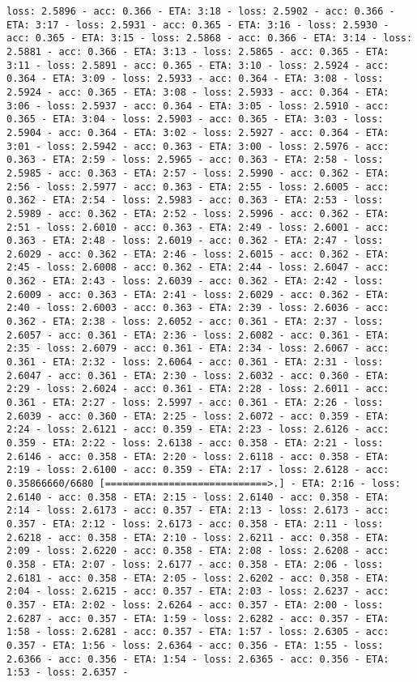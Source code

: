 \documentclass[11pt]{article}
\begin{document}
\begin{Verbatim}[commandchars=\\\{\}]
loss: 2.5896 - acc: 0.366 - ETA: 3:18 - loss: 2.5902 - acc: 0.366 - ETA: 3:17 - loss: 2.5931 - acc: 0.365 - ETA: 3:16 - loss: 2.5930 - acc: 0.365 - ETA: 3:15 - loss: 2.5868 - acc: 0.366 - ETA: 3:14 - loss: 2.5881 - acc: 0.366 - ETA: 3:13 - loss: 2.5865 - acc: 0.365 - ETA: 3:11 - loss: 2.5891 - acc: 0.365 - ETA: 3:10 - loss: 2.5924 - acc: 0.364 - ETA: 3:09 - loss: 2.5933 - acc: 0.364 - ETA: 3:08 - loss: 2.5924 - acc: 0.365 - ETA: 3:08 - loss: 2.5933 - acc: 0.364 - ETA: 3:06 - loss: 2.5937 - acc: 0.364 - ETA: 3:05 - loss: 2.5910 - acc: 0.365 - ETA: 3:04 - loss: 2.5903 - acc: 0.365 - ETA: 3:03 - loss: 2.5904 - acc: 0.364 - ETA: 3:02 - loss: 2.5927 - acc: 0.364 - ETA: 3:01 - loss: 2.5942 - acc: 0.363 - ETA: 3:00 - loss: 2.5976 - acc: 0.363 - ETA: 2:59 - loss: 2.5965 - acc: 0.363 - ETA: 2:58 - loss: 2.5985 - acc: 0.363 - ETA: 2:57 - loss: 2.5990 - acc: 0.362 - ETA: 2:56 - loss: 2.5977 - acc: 0.363 - ETA: 2:55 - loss: 2.6005 - acc: 0.362 - ETA: 2:54 - loss: 2.5983 - acc: 0.363 - ETA: 2:53 - loss: 2.5989 - acc: 0.362 - ETA: 2:52 - loss: 2.5996 - acc: 0.362 - ETA: 2:51 - loss: 2.6010 - acc: 0.363 - ETA: 2:49 - loss: 2.6001 - acc: 0.363 - ETA: 2:48 - loss: 2.6019 - acc: 0.362 - ETA: 2:47 - loss: 2.6029 - acc: 0.362 - ETA: 2:46 - loss: 2.6015 - acc: 0.362 - ETA: 2:45 - loss: 2.6008 - acc: 0.362 - ETA: 2:44 - loss: 2.6047 - acc: 0.362 - ETA: 2:43 - loss: 2.6039 - acc: 0.362 - ETA: 2:42 - loss: 2.6009 - acc: 0.363 - ETA: 2:41 - loss: 2.6029 - acc: 0.362 - ETA: 2:40 - loss: 2.6003 - acc: 0.363 - ETA: 2:39 - loss: 2.6036 - acc: 0.362 - ETA: 2:38 - loss: 2.6052 - acc: 0.361 - ETA: 2:37 - loss: 2.6057 - acc: 0.361 - ETA: 2:36 - loss: 2.6082 - acc: 0.361 - ETA: 2:35 - loss: 2.6079 - acc: 0.361 - ETA: 2:34 - loss: 2.6067 - acc: 0.361 - ETA: 2:32 - loss: 2.6064 - acc: 0.361 - ETA: 2:31 - loss: 2.6047 - acc: 0.361 - ETA: 2:30 - loss: 2.6032 - acc: 0.360 - ETA: 2:29 - loss: 2.6024 - acc: 0.361 - ETA: 2:28 - loss: 2.6011 - acc: 0.361 - ETA: 2:27 - loss: 2.5997 - acc: 0.361 - ETA: 2:26 - loss: 2.6039 - acc: 0.360 - ETA: 2:25 - loss: 2.6072 - acc: 0.359 - ETA: 2:24 - loss: 2.6121 - acc: 0.359 - ETA: 2:23 - loss: 2.6126 - acc: 0.359 - ETA: 2:22 - loss: 2.6138 - acc: 0.358 - ETA: 2:21 - loss: 2.6146 - acc: 0.358 - ETA: 2:20 - loss: 2.6118 - acc: 0.358 - ETA: 2:19 - loss: 2.6100 - acc: 0.359 - ETA: 2:17 - loss: 2.6128 - acc: 0.35866660/6680 [============================>.] - ETA: 2:16 - loss: 2.6140 - acc: 0.358 - ETA: 2:15 - loss: 2.6140 - acc: 0.358 - ETA: 2:14 - loss: 2.6173 - acc: 0.357 - ETA: 2:13 - loss: 2.6173 - acc: 0.357 - ETA: 2:12 - loss: 2.6173 - acc: 0.358 - ETA: 2:11 - loss: 2.6218 - acc: 0.358 - ETA: 2:10 - loss: 2.6211 - acc: 0.358 - ETA: 2:09 - loss: 2.6220 - acc: 0.358 - ETA: 2:08 - loss: 2.6208 - acc: 0.358 - ETA: 2:07 - loss: 2.6177 - acc: 0.358 - ETA: 2:06 - loss: 2.6181 - acc: 0.358 - ETA: 2:05 - loss: 2.6202 - acc: 0.358 - ETA: 2:04 - loss: 2.6215 - acc: 0.357 - ETA: 2:03 - loss: 2.6237 - acc: 0.357 - ETA: 2:02 - loss: 2.6264 - acc: 0.357 - ETA: 2:00 - loss: 2.6287 - acc: 0.357 - ETA: 1:59 - loss: 2.6282 - acc: 0.357 - ETA: 1:58 - loss: 2.6281 - acc: 0.357 - ETA: 1:57 - loss: 2.6305 - acc: 0.357 - ETA: 1:56 - loss: 2.6364 - acc: 0.356 - ETA: 1:55 - loss: 2.6366 - acc: 0.356 - ETA: 1:54 - loss: 2.6365 - acc: 0.356 - ETA: 1:53 - loss: 2.6357 - 
\end{Verbatim}
\end{document}
